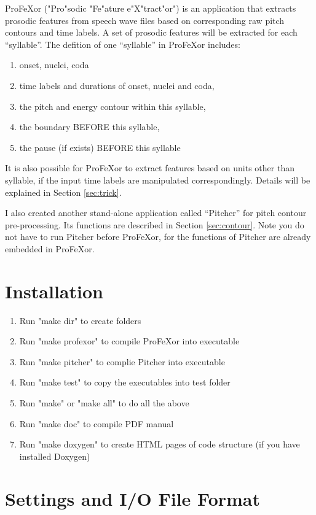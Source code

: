 \documentclass[12pt]{article}
\begin{document}
ProFeXor ("Pro"sodic "Fe"ature e"X"tract"or") is an application that extracts prosodic features from speech wave files based on corresponding raw pitch contours and time labels. A set of prosodic features will be extracted for each ``syllable''. The defition of one ``syllable'' in ProFeXor includes:
\begin{enumerate}
\item onset, nuclei, coda
\item time labels and durations of onset, nuclei and coda,
\item the pitch and energy contour within this syllable,
\item the boundary BEFORE this syllable,
\item the pause (if exists) BEFORE this syllable
\end{enumerate}
It is also possible for ProFeXor to extract features based on units other than syllable, if the input time labels are manipulated correspondingly. Details will be explained in Section \ref{sec:trick}.

I also created another stand-alone application called ``Pitcher'' for pitch contour pre-processing. Its functions are described in Section \ref{sec:contour}. Note you do not have to run Pitcher before ProFeXor, for the functions of Pitcher are already embedded in ProFeXor.

\section{Installation}

\begin{enumerate}
\item Run "make dir" to create folders
\item Run "make profexor" to compile ProFeXor into executable
\item Run "make pitcher" to complie Pitcher into executable
\item Run "make test" to copy the executables into test folder
\item Run "make" or "make all" to do all the above
\item Run "make doc" to compile PDF manual
\item Run "make doxygen" to create HTML pages of code structure (if you have installed Doxygen)
\end{enumerate}

\section{Settings and I/O File Format}
\end{document}
